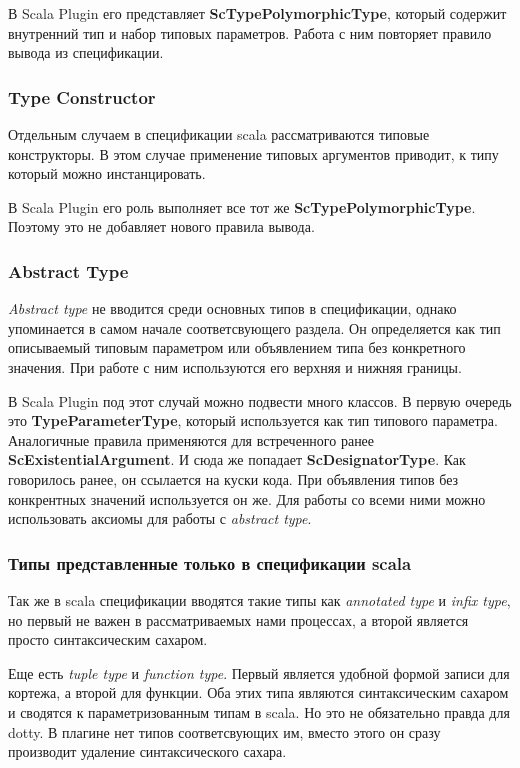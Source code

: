 В Scala Plugin его представляет \textbf{ScTypePolymorphicType}, который содержит
внутренний тип и набор типовых параметров.
Работа с ним повторяет правило вывода из спецификации.

\subsubsection{Type Constructor}
Отдельным случаем в спецификации scala рассматриваются типовые конструкторы.
В этом случае применение типовых аргументов приводит, к типу который можно
инстанцировать.

В Scala Plugin его роль выполняет все тот же \textbf{ScTypePolymorphicType}.
Поэтому это не добавляет нового правила вывода.

\subsubsection{Abstract Type}

\textit{Abstract type} не вводится среди основных типов в спецификации, однако
упоминается в самом начале соответсвующего раздела.
Он определяется как тип описываемый типовым параметром или объявлением типа без
конкретного значения.
При работе с ним используются его верхняя и нижняя границы.

В Scala Plugin под этот случай можно подвести много классов.
В первую очередь это \textbf{TypeParameterType}, который используется как тип
типового параметра.
Аналогичные правила применяются для встреченного ранее
\textbf{ScExistentialArgument}.
И сюда же попадает \textbf{ScDesignatorType}.
Как говорилось ранее, он ссылается на куски кода.
При объявления типов без конкрентных значений используется он же.
Для работы со всеми ними можно использовать аксиомы для работы с \textit{abstract type}.

\subsubsection{Типы представленные только в спецификации scala}
Так же в scala спецификации вводятся такие типы как \textit{annotated type} и
\textit{infix type}, но первый не важен в рассматриваемых нами процессах,
а второй является просто синтаксическим сахаром.

Еще есть \textit{tuple type} и \textit{function type}.
Первый является удобной формой записи для кортежа, а второй для функции.
Оба этих типа являются синтаксическим сахаром и сводятся к параметризованным
типам в scala.
Но это не обязательно правда для dotty.
В плагине нет типов соответсвующих им, вместо этого он сразу производит
удаление синтаксического сахара.

